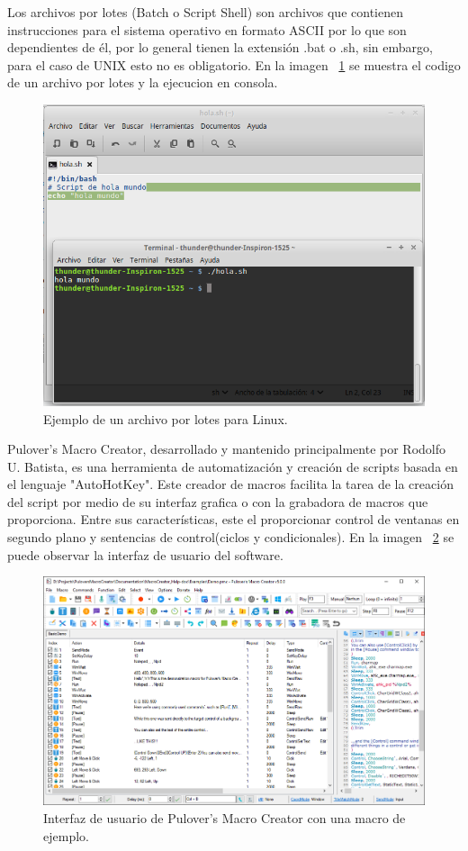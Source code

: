 Los archivos por lotes (Batch o Script Shell) \cite{Silberschatz1999} son
 archivos que contienen instrucciones para el sistema operativo en formato
 ASCII por lo que son dependientes de él, por lo general tienen la extensión
 .bat o .sh, sin embargo, para el caso de UNIX esto no es obligatorio. En la
 imagen ~\ref{fig:script} se muestra el codigo de un archivo por lotes y la 
 ejecucion en consola.


\begin{figure}[H]
\centering
\includegraphics[width=0.5\columnwidth]{CapituloI/Imagenes/Script.png}
\caption{Ejemplo de un archivo por lotes para Linux.}
\label{fig:script}
\end{figure}


Pulover's Macro Creator\cite{Batista}, desarrollado y mantenido principalmente
 por Rodolfo U. Batista, es una herramienta de automatización y creación de
 scripts basada en el lenguaje "AutoHotKey". Este  creador de macros facilita
 la tarea de la creación del script por medio de  su interfaz grafica o con la
 grabadora de macros que proporciona. Entre sus características, este el
 proporcionar  control de ventanas en segundo plano y sentencias de
 control(ciclos y condicionales). En la imagen ~\ref{fig:macros} se puede observar la interfaz de usuario del software.


\begin{figure}[H]
\centering
\includegraphics[width=0.5\columnwidth]{CapituloI/Imagenes/Macros.png}
\caption{Interfaz de usuario de Pulover's Macro Creator con una macro de
 ejemplo.}
\label{fig:macros}
\end{figure}



